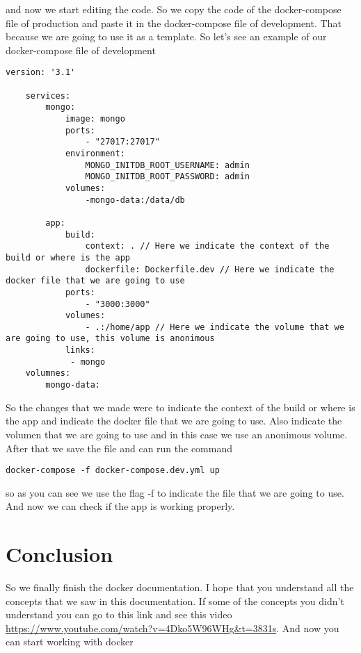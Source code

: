 \documentclass{article}
\begin{document}
and now we start editing the code. So we copy the code of the docker-compose file of production and paste it 
in the docker-compose file of development. That because we are going to use it as a template. So let's see an example of our 
docker-compose file of development
\begin{lstlisting}[breaklines=true, breakatwhitespace=true]
    version: '3.1' 

    services: 
        mongo: 
            image: mongo 
            ports:
                - "27017:27017"
            environment: 
                MONGO_INITDB_ROOT_USERNAME: admin
                MONGO_INITDB_ROOT_PASSWORD: admin
            volumes: 
                -mongo-data:/data/db 
         
        app:
            build: 
                context: . // Here we indicate the context of the build or where is the app 
                dockerfile: Dockerfile.dev // Here we indicate the docker file that we are going to use
            ports:
                - "3000:3000"
            volumes: 
                - .:/home/app // Here we indicate the volume that we are going to use, this volume is anonimous
            links: 
             - mongo
    volumnes: 
        mongo-data:
\end{lstlisting}
 
So the changes that we made were to indicate the context of the build or where is the app and indicate the docker file that we are going to use. Also indicate the volumen 
that we are going to use and in this case we use an anonimous volume. After that we save the file and can run the command 
\begin{lstlisting}[breaklines=true, breakatwhitespace=true]
    docker-compose -f docker-compose.dev.yml up
\end{lstlisting}

so as you can see we use the flag -f to indicate the file that we are going to use. And now we can check if the app is working properly. 

\section*{Conclusion}

So we finally finish the docker documentation. I hope that you understand all the concepts that we saw in this documentation. If some of the concepts you didn't 
understand you can go to this link and see this video \url{https://www.youtube.com/watch?v=4Dko5W96WHg&t=3831s}. And now you can start working with docker 
\end{document}

